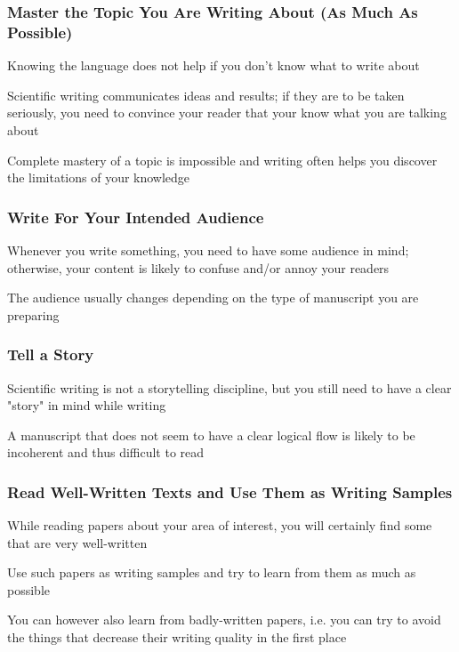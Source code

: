 \documentclass{beamer}
\begin{document}
\begin{frame}
\frametitle{Master the Topic You Are Writing About (As Much As Possible)}
    \vspace{-1cm}
    Knowing the language does not help if you don't know what to write about
    \newline

    Scientific writing communicates ideas and results; if they are to be taken seriously, you need to convince your reader that your know what you are talking about
    \newline

    Complete mastery of a topic is impossible and writing often helps you discover the limitations of your knowledge
\end{frame}

\begin{frame}
\frametitle{Write For Your Intended Audience}
    Whenever you write something, you need to have some audience in mind; otherwise, your content is likely to confuse and/or annoy your readers
    \newline

    The audience usually changes depending on the type of manuscript you are preparing
\end{frame}

\begin{frame}
\frametitle{Tell a Story}
    Scientific writing is not a storytelling discipline, but you still need to have a clear "story" in mind while writing
    \newline

    A manuscript that does not seem to have a clear logical flow is likely to be incoherent and thus difficult to read
\end{frame}

\begin{frame}
\frametitle{Read Well-Written Texts and Use Them as Writing Samples}
    \vspace{-1cm}
    While reading papers about your area of interest, you will certainly find some that are very well-written
    \newline

    Use such papers as writing samples and try to learn from them as much as possible
    \newline

    You can however also learn from badly-written papers, i.e. you can try to avoid the things that decrease their writing quality in the first place
\end{frame}
\end{document}
